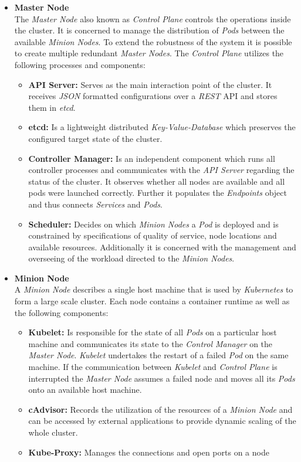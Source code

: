\begin{itemize}
    \item[]{\textbf{Master Node}\\
    The \textit{Master Node} also known as \textit{Control Plane} controls the operations inside the cluster.
    It is concerned to manage the distribution of \textit{Pods} between the available \textit{Minion Nodes}.
    To extend the robustness of the system it is possible to create multiple redundant \textit{Master Nodes}.
    The \textit{Control Plane} utilizes the following processes and components:
    \begin{itemize}
    \item[]{\textbf{API Server: }Serves as the main interaction point of the cluster.
    It receives \textit{JSON} formatted configurations over a \textit{REST} API and stores them in \textit{etcd}.
    }
    \item[]{\textbf{etcd: }Is a lightweight distributed \textit{Key-Value-Database} which preserves the configured target state of the cluster.
    }
    \item[]{\textbf{Controller Manager: }Is an independent component which runs all controller processes and communicates with the \textit{API Server} regarding the status of the cluster.
    It observes whether all nodes are available and all pods were launched correctly.
    Further it populates the \textit{Endpoints} object and thus connects \textit{Services} and \textit{Pods}.
    }
    \item[]{\textbf{Scheduler: }Decides on which \textit{Minion Nodes} a \textit{Pod} is deployed and is constrained by specifications of quality of service, node locations and available resources.
    Additionally it is concerned with the management and overseeing of the workload directed to the \textit{Minion Nodes}.
    }
    \end{itemize}
    }
    \item[]{\textbf{Minion Node}\\
    A \textit{Minion Node} describes a single host machine that is used by \textit{Kubernetes} to form a large scale cluster.
    Each node contains a container runtime as well as the following components:
    \begin{itemize}
    \item[]{\textbf{Kubelet: }Is responsible for the state of all \textit{Pods} on a particular host machine and communicates its state to the \textit{Control Manager} on the \textit{Master Node}.
    \textit{Kubelet} undertakes the restart of a failed \textit{Pod} on the same machine.
    If the communication between \textit{Kubelet} and \textit{Control Plane} is interrupted the \textit{Master Node} assumes a failed node and moves all its \textit{Pods} onto an available host machine.
    }
    \item[]{\textbf{cAdvisor: }Records the utilization of the resources of a \textit{Minion Node} and can be accessed by external applications to provide dynamic scaling of the whole cluster.}
    \item[]{\textbf{Kube-Proxy: }Manages the connections and open ports on a node}
    \end{itemize}
    }
\end{itemize}

